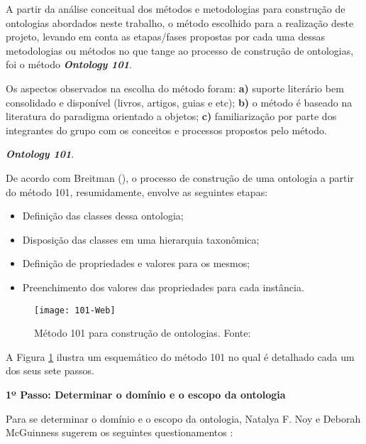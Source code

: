 
  A partir da análise conceitual dos métodos e metodologias para construção de ontologias abordados neste trabalho, 
  o método escolhido para a realização deste projeto, levando em conta as etapas/fases propostas por cada uma dessas 
  metodologias ou métodos no que tange ao processo de construção de ontologias, foi o método \textit{\textbf{Ontology 101}}.
  
  Os aspectos observados na escolha do método foram: \textbf{a)} suporte literário bem consolidado e disponível 
  (livros, artigos, guias e etc); \textbf{b)} o método é baseado na literatura do paradigma orientado a objetos;
  \textbf{c)} familiarização por parte dos integrantes do grupo com os conceitos e processos propostos pelo método.

\vspace{0.5cm}
  
{\raggedright
  \textit{\textbf{Ontology 101}}.
}
  
  De acordo com Breitman (\citeyear{breitman05}), o processo de construção de uma ontologia a partir do método 101,
  resumidamente, envolve as seguintes etapas:
  \begin{itemize}
   \item Definição das classes dessa ontologia;
   \item Disposição das classes em uma hierarquia taxonômica;
   \item Definição de propriedades e valores para os mesmos;
   \item Preenchimento dos valores das propriedades para cada instância.
  \end{itemize}
  
  \begin{figure}[!htb]
    \centering
    \texttt{[image: 101-Web]}
    \caption[Método 101 para construção de ontologia]{Método 101 para construção de ontologias. Fonte: \cite{bortolato14}}
    \label{fig:101-Web}
  \end{figure}
  
  A Figura \ref{fig:101-Web} ilustra um esquemático do método 101 no qual é detalhado cada um dos seus sete passos.
  
\vspace{0.5cm}  
  
{\raggedright  
  \textbf{1º Passo: Determinar o domínio e o escopo da ontologia}
}
  
  Para se determinar o domínio e o escopo da ontologia, Natalya F. Noy e Deborah McGuinness sugerem os seguintes questionamentos
  \cite{breitman05}:
  
